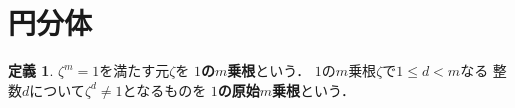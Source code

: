 \documentclass[dvipdfmx,a4paper,12pt]{jsarticle}
\makeatletter
\theoremstyle{definition}
\newtheorem{theorem}{定理}[section]
\newtheorem{definition}[theorem]{定義}
\renewcommand{\proofname}{証明}
\renewenvironment{proof}[1][\proofname]{%
  \par\pushQED{\qed}%
  \normalfont \topsep6\p@\@plus6\p@\relax
  \trivlist
  \item[\hskip\labelsep\bfseries#1\@addpunct{.}]\ignorespaces
}{%
  \popQED\endtrivlist\@endpefalse
}
\makeatother
\begin{document}
\begin{abstract}
    円分多項式に関するあれこれ
\end{abstract}

\section{円分体}
\begin{definition}
    $\zeta^m=1$を満たす元$\zeta$を
    $1$\textbf{の}$m$\textbf{乗根}という．
    $1$の$m$乗根$\zeta$で$1\leq d<m$なる
    整数$d$について$\zeta^d\neq 1$となるものを
    $1$\textbf{の原始}$m$\textbf{乗根}という．
\end{definition}

\end{document}
